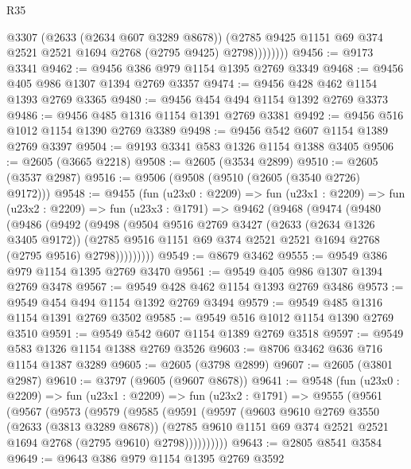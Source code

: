 \begin{lexlean}{R35}
\begin{coremodule}
                  @3307
                  (@2633 (@2634 @607 @3289 @8678))
                  (@2785 @9425 @1151 @69 @374 @2521 @2521 @1694 @2768 (@2795 @9425) @2798))))))))
@9456 := @9173 @3341
@9462 := @9456 @386 @979 @1154 @1395 @2769 @3349
@9468 := @9456 @405 @986 @1307 @1394 @2769 @3357
@9474 := @9456 @428 @462 @1154 @1393 @2769 @3365
@9480 := @9456 @454 @494 @1154 @1392 @2769 @3373
@9486 := @9456 @485 @1316 @1154 @1391 @2769 @3381
@9492 := @9456 @516 @1012 @1154 @1390 @2769 @3389
@9498 := @9456 @542 @607 @1154 @1389 @2769 @3397
@9504 := @9193 @3341 @583 @1326 @1154 @1388 @3405
@9506 := @2605 (@3665 @2218)
@9508 := @2605 (@3534 @2899)
@9510 := @2605 (@3537 @2987)
@9516 := @9506 (@9508 (@9510 (@2605 (@3540 @2726) @9172)))
@9548 := @9455
    (fun (u23x0 : @2209) =>
    fun (u23x1 : @2209) =>
    fun (u23x2 : @2209) =>
    fun (u23x3 : @1791) =>
    @9462
      (@9468
        (@9474
          (@9480
            (@9486
              (@9492
                (@9498
                  (@9504
                    @9516
                    @2769
                    @3427
                    (@2633 (@2634 @1326 @3405 @9172))
                    (@2785 @9516 @1151 @69 @374 @2521 @2521 @1694 @2768 (@2795 @9516) @2798)))))))))
@9549 := @8679 @3462
@9555 := @9549 @386 @979 @1154 @1395 @2769 @3470
@9561 := @9549 @405 @986 @1307 @1394 @2769 @3478
@9567 := @9549 @428 @462 @1154 @1393 @2769 @3486
@9573 := @9549 @454 @494 @1154 @1392 @2769 @3494
@9579 := @9549 @485 @1316 @1154 @1391 @2769 @3502
@9585 := @9549 @516 @1012 @1154 @1390 @2769 @3510
@9591 := @9549 @542 @607 @1154 @1389 @2769 @3518
@9597 := @9549 @583 @1326 @1154 @1388 @2769 @3526
@9603 := @8706 @3462 @636 @716 @1154 @1387 @3289
@9605 := @2605 (@3798 @2899)
@9607 := @2605 (@3801 @2987)
@9610 := @3797 (@9605 (@9607 @8678))
@9641 := @9548
    (fun (u23x0 : @2209) =>
    fun (u23x1 : @2209) =>
    fun (u23x2 : @1791) =>
    @9555
      (@9561
        (@9567
          (@9573
            (@9579
              (@9585
                (@9591
                  (@9597
                    (@9603
                      @9610
                      @2769
                      @3550
                      (@2633 (@3813 @3289 @8678))
                      (@2785
                        @9610
                        @1151
                        @69
                        @374
                        @2521
                        @2521
                        @1694
                        @2768
                        (@2795 @9610)
                        @2798))))))))))
@9643 := @2805 @8541 @3584
@9649 := @9643 @386 @979 @1154 @1395 @2769 @3592

\end{coremodule}
\end{lexlean}
